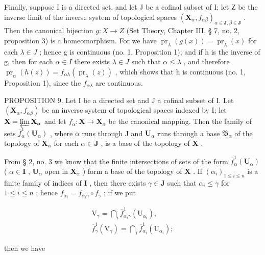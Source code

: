 Finally, suppose I is a directed set, and let J be a cofinal subset of I; let Z be the inverse limit of the inverse system of topological spaces \((\mathbf{X}_{\alpha}, f_{\alpha\beta})_{\alpha\in\mathbf{J}, \beta\in\mathbf{J}}\) . Then the canonical bijection \(g: X \to Z\) (Set Theory, Chapter III, § 7, no. 2, proposition 3) is a homeomorphism. For we have \(\operatorname{pr}_{\lambda}(g(x)) = \operatorname{pr}_{\lambda}(x)\) for each \(\lambda \in J\) ; hence g is continuous (no. 1, Proposition 1); and if h is the inverse of g, then for each \(\alpha \in I\) there exists \(\lambda \in J\) such that \(\alpha \leqslant \lambda\) , and therefore \(\operatorname{pr}_{\alpha}(h(z)) = f_{\alpha\lambda}(\operatorname{pr}_{\lambda}(z))\) , which shows that h is continuous (no. 1, Proposition 1), since the \(f_{\alpha\lambda}\) are continuous.

PROPOSITION 9. Let I be a directed set and J a cofinal subset of I. Let \((\mathbf{X}_{\alpha}, f_{\alpha \beta})\) be an inverse system of topological spaces indexed by I; let \(\mathbf{X} = \varprojlim \mathbf{X}_{\alpha}\) and let \(f_{\alpha}: \mathbf{X} \to \mathbf{X}_{\alpha}\) be the canonical mapping. Then the family of sets \(\overline{f}_{\alpha}^{1}(\mathbf{U}_{\alpha})\) , where \(\alpha\) runs through J and \(\mathbf{U}_{\alpha}\) runs through a base \(\mathfrak{B}_{\alpha}\) of the topology of \(\mathbf{X}_{\alpha}\) for each \(\alpha \in \mathbf{J}\) , is a base of the topology of \(\mathbf{X}\) .

From § 2, no. 3 we know that the finite intersections of sets of the form \(\overline{f}_{\alpha}^{1}(\mathbf{U}_{\alpha})\) ( \(\alpha \in \mathbf{I}\) , \(\mathbf{U}_{\alpha}\) open in \(\mathbf{X}_{\alpha}\) ) form a base of the topology of \(\mathbf{X}\) . If \((\alpha_i)_{1 \leqslant i \leqslant n}\) is a finite family of indices of \(\mathbf{I}\) , then there exists \(\gamma \in \mathbf{J}\) such that \(\alpha_i \leqslant \gamma\) for \(1 \leqslant i \leqslant n\) ; hence \(f_{\alpha_i} = f_{\alpha_i \gamma} \circ f_\gamma\) ; if we put

\[
\begin{array}{c} \mathrm{V} _ {\gamma} = \bigcap_ {i} \overline {{f}} _ {\alpha_ {i} \gamma} ^ {1} (\mathrm{U} _ {\alpha_ {i}}), \\ \overline {{f}} _ {\gamma} ^ {1} (\mathrm{V} _ {\gamma}) = \bigcap_ {i} \overline {{f}} _ {\alpha_ {i}} ^ {1} (\mathrm{U} _ {\alpha_ {i}}); \end{array}
\]

then we have

